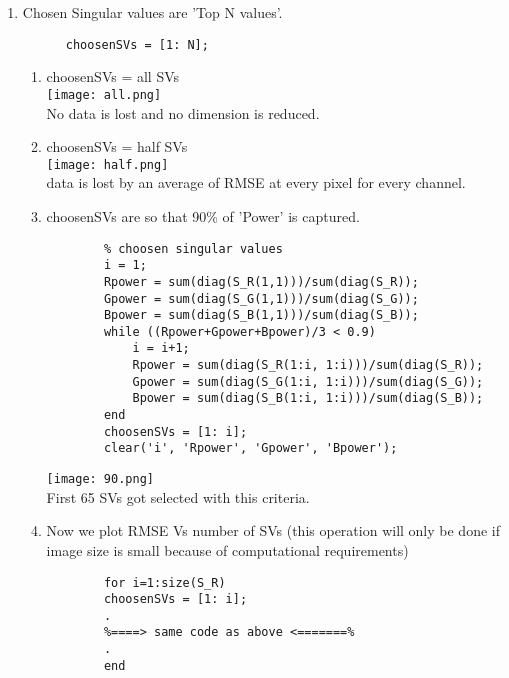 \documentclass{article}
\begin{document}
\begin{enumerate}
\begin{enumerate}
\begin{lstlisting}
      subplot(2, 2,2);
      image(imgHat);
      title('image recreated')
      subplot(2, 2, 3);
      image(oriImg-imgHat);
      title('Error image. $$A - \hat{A}$$', 'Interpreter','Latex')
      tsp = subplot(2,2,4);
      text(0.2,0.5,['The RMSE error is ', num2str(RMSE)]);
      set ( tsp, 'visible', 'off')
    \end{lstlisting}

    Now we can play with chosenSVs to for different cases.

    \item Chosen Singular values are 'Top N values'.
    \begin{lstlisting}
      choosenSVs = [1: N];
    \end{lstlisting}
    \begin{enumerate}
      \item choosenSVs = all SVs\\
      \texttt{[image: all.png]}\\
      No data is lost and no dimension is reduced.
      \newpage
      \item choosenSVs = half SVs\\
      \texttt{[image: half.png]}\\
      data is lost by an average of RMSE at every pixel for every channel.
      \item choosenSVs are so that 90\% of 'Power' is captured.\\
      \begin{lstlisting}
        % choosen singular values
        i = 1;
        Rpower = sum(diag(S_R(1,1)))/sum(diag(S_R));
        Gpower = sum(diag(S_G(1,1)))/sum(diag(S_G));
        Bpower = sum(diag(S_B(1,1)))/sum(diag(S_B));
        while ((Rpower+Gpower+Bpower)/3 < 0.9)
            i = i+1;
            Rpower = sum(diag(S_R(1:i, 1:i)))/sum(diag(S_R));
            Gpower = sum(diag(S_G(1:i, 1:i)))/sum(diag(S_G));
            Bpower = sum(diag(S_B(1:i, 1:i)))/sum(diag(S_B));
        end
        choosenSVs = [1: i];
        clear('i', 'Rpower', 'Gpower', 'Bpower');

      \end{lstlisting}
      \texttt{[image: 90.png]}\\
      First 65 SVs got selected with this criteria.
      \newpage
      \item Now we plot RMSE Vs number of SVs (this operation will only be done if image size is small because of computational requirements)
      \begin{lstlisting}
        for i=1:size(S_R)
        choosenSVs = [1: i];
        .
        %====> same code as above <=======%
        .
        end


\end{lstlisting}
\end{enumerate}
\end{enumerate}
\end{enumerate}
\end{document}

